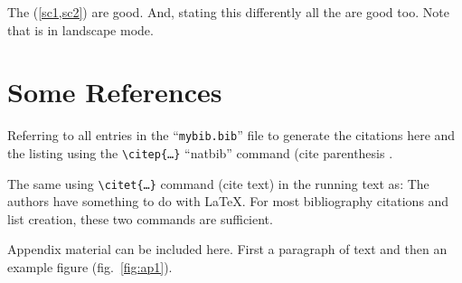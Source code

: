 \documentclass[ms-thesis,mathdesign,12pt]{ndsu-thesis-2022}
\begin{document}
\vspace{-0.3in}
\kant[9]

\vspace{-1.5ex}


\vspace{-0.3in}
\kant[2]\kant[9]

The (\cref{sc1,sc2}) are good. And, stating this differently all the  are good too. Note that  is in landscape mode.



\section{Some References}
Referring to all entries in the ``\texttt{mybib.bib}'' file to generate the citations here and the listing using the \texttt{\textbackslash citep\{\ldots\}} ``natbib'' command (cite parenthesis \citep{texbook,lcompanion,latex2e,knuth1984,lesk1977,amsthm2017,calvo2004using,cannayen2011latex,kopka2004guide,notso2021,bari2016identification}.

The same using \texttt{\textbackslash citet\{\ldots\}} command (cite text) in the running text as: The authors \citet{texbook,lcompanion,latex2e,knuth1984,lesk1977,amsthm2017,calvo2004using,cannayen2011latex,kopka2004guide,notso2021,bari2016identification} have something to do with \LaTeX. For most bibliography citations and list creation, these two commands are sufficient.



\makerefs %


Appendix material can be included here. First a paragraph of text and then an example figure (fig.~\ref{fig:ap1}).

\end{document}
